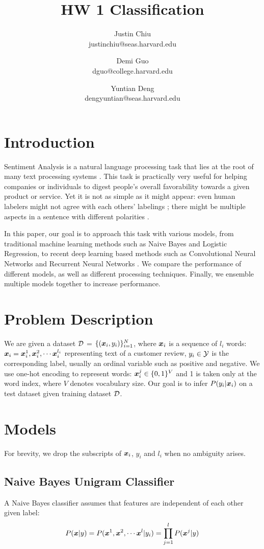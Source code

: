 \documentclass[11pt]{article}
\title{HW 1 Classification}
\author{Justin Chiu \\ justinchiu@seas.harvard.edu \and Demi Guo \\ dguo@college.harvard.edu \and Yuntian Deng \\dengyuntian@seas.harvard.edu }
\begin{document}
\maketitle{}
\section{Introduction}
Sentiment Analysis is a natural language processing task that lies at the root of many text processing systems \citep{nasukawa2003sentiment,miner2012practical,khan2015combining}. 
This task is practically very useful for helping companies or individuals to digest people's overall favorability towards a given product or service. 
Yet it is not as simple as it might appear: even human labelers might not agree with each others' labelings \citep{liu2010sentiment}; there might be multiple aspects in a sentence with different polarities \citep{lei2016rationalizing}.

In this paper, our goal is to approach this task with various models, from traditional machine learning methods such as Naive Bayes and Logistic Regression, to recent deep learning based methods such as Convolutional Neural Networks \citep{kim2014convolutional} and Recurrent Neural Networks \citep{hochreiter1997long}. We compare the performance of different models, as well as different processing techniques. Finally, we ensemble multiple models together to increase performance.

\section{Problem Description}
We are given a dataset $\mathcal{D}$ = $\{(\boldsymbol{x}_i, y_i)\}_{i=1}^N$, where $\boldsymbol{x}_i$ is a sequence of $l_i$ words: $\boldsymbol{x}_i = \boldsymbol{x}_{i}^1, \boldsymbol{x}_{i}^2, \cdots \boldsymbol{x}_i^{l_i}$ representing text of a customer review, $y_i\in \mathcal{Y}$ is the corresponding label, usually an ordinal variable such as positive and negative.
We use one-hot encoding to represent words: $\boldsymbol{x}_i^j\in \{0,1\}^{V}$ and 1 is taken only at the word index, where $V$ denotes vocabulary size. Our goal is to infer $P(y_i | \boldsymbol{x}_i)$ on a test dataset given training dataset $\mathcal{D}$.


\section{Models}
For brevity, we drop the subscripts of $\boldsymbol{x}_i$, $y_i$ and $l_i$ when no ambiguity arises.
\subsection{Naive Bayes Unigram Classifier}
A Naive Bayes classifier assumes that features are independent of each other given label:
\begin{equation*}
    P(\boldsymbol{x} | y) = P(\boldsymbol{x}^1, \boldsymbol{x}^2, \cdots \boldsymbol{x}^{l} | y_i) = \prod_{j=1}^{l}P(\boldsymbol{x}^j | y)
\end{equation*}
\end{document}

